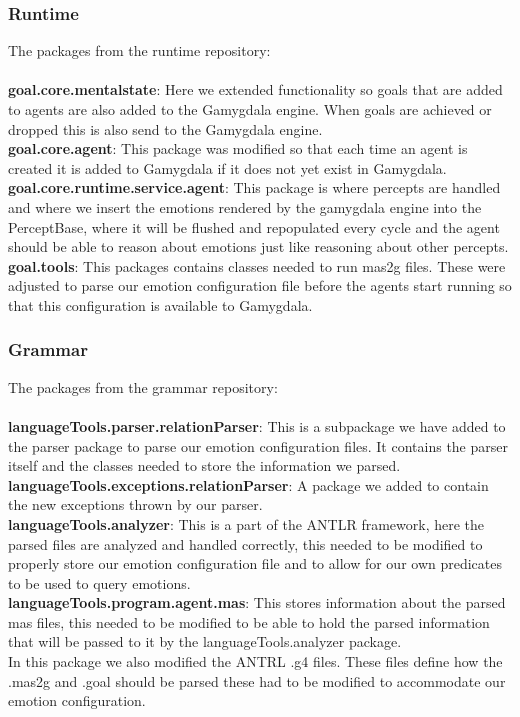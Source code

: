 \documentclass[]{article}
\begin{document}
\subsubsection{Runtime}
The packages from the runtime repository: \\ \\
\textbf{goal.core.mentalstate}: Here we extended functionality so goals that are added to agents are also added to the Gamygdala engine. When goals are achieved or dropped this is also send to the Gamygdala engine. \\
\textbf{goal.core.agent}: This package was modified so that each time an agent is created it is added to Gamygdala if it does not yet exist in Gamygdala. \\
\textbf{goal.core.runtime.service.agent}: This package is where percepts are handled and where we insert the emotions rendered by the gamygdala engine into the PerceptBase, where it will be flushed and repopulated every cycle and the agent should be able to reason about emotions just like reasoning about other percepts. \\
\textbf{goal.tools}: This packages contains classes needed to run mas2g files. These were adjusted to parse our emotion configuration file before the agents start running so that this configuration is available to Gamygdala.


\subsubsection{Grammar}
The packages from the grammar repository: \\ \\
\textbf{languageTools.parser.relationParser}: This is a subpackage we have added to the parser package to parse our emotion configuration files. It contains the parser itself and the classes needed to store the information we parsed.\\
\textbf{languageTools.exceptions.relationParser}: A package we added to contain the new exceptions thrown by our parser. \\
\textbf{languageTools.analyzer}: This is a part of the ANTLR framework, here the parsed files are analyzed and handled correctly, this needed to be modified to properly store our emotion configuration file and to allow for our own predicates to be used to query emotions. \\
\textbf{languageTools.program.agent.mas}: This stores information about the parsed mas files, this needed to be modified to be able to hold the parsed information that will be passed to it by the languageTools.analyzer package.
\\
In this package we also modified the ANTRL .g4 files. These files define how the .mas2g and .goal should be parsed these had to be modified to accommodate our emotion configuration.
\newpage
\end{document}
